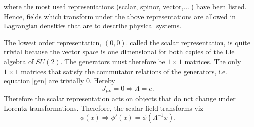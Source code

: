 where the most used representations (scalar, spinor, vector,... ) have been listed. Hence, fields which transform under the above representations are allowed in Lagrangian densities that are to describe physical systems. 
\begin{example}
	The lowest order representation, $(0,0)$, called the scalar representation, is quite  trivial because the vector space is one dimensional for both copies of the Lie algebra of $SU(2)$. The generators must therefore be $1\times 1$ matrices. The only $1\times 1$ matrices that satisfy the commutator relations of the generators, i.e. equation \eqref{gen} are trivially $0$. Hereby
	\begin{equation}
		J_{\mu\nu}=0\Rightarrow \Lambda=e.
	\end{equation} 
	Therefore the scalar representation acts on objects that do not change under Lorentz transformations. Therefore, the scalar field transforms viz
	\begin{equation}
		\phi(x)\Rightarrow \phi'(x)=\phi(\Lambda^{-1}x).
	\end{equation} 
\end{example}

